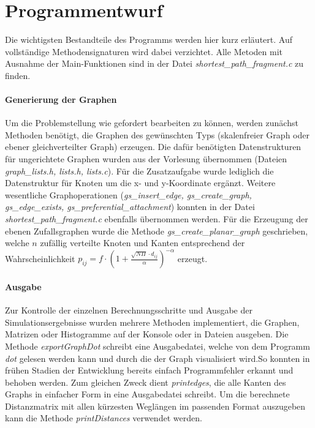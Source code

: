 \documentclass[10pt]{article}
\begin{document}
\section{Programmentwurf}

Die wichtigsten Bestandteile des Programms werden hier kurz erläutert. Auf vollständige Methodensignaturen wird dabei verzichtet. Alle Metoden mit Ausnahme der Main-Funktionen sind in der Datei \textit{shortest\_path\_fragment.c} zu finden.

\paragraph{Generierung der Graphen}
Um die Problemstellung wie gefordert bearbeiten zu können, werden zunächst Methoden benötigt, die Graphen des gewünschten Typs (skalenfreier Graph oder ebener gleichverteilter Graph) erzeugen. Die dafür benötigten Datenstrukturen für ungerichtete Graphen wurden aus der Vorlesung übernommen (Dateien \textit{graph\_lists.h, lists.h, lists.c}). Für die Zusatzaufgabe wurde lediglich die Datenstruktur für Knoten um die x- und y-Koordinate ergänzt. Weitere wesentliche Graphoperationen (\textit{gs\_insert\_edge, gs\_create\_graph, gs\_edge\_exists, gs\_preferential\_attachment}) konnten in der Datei \textit{shortest\_path\_fragment.c} ebenfalls übernommen werden. Für die Erzeugung der ebenen Zufallsgraphen wurde die Methode \textit{gs\_create\_planar\_graph} geschrieben, welche $n$ zufällig verteilte Knoten und Kanten entsprechend der Wahrscheinlichkeit $p_{ij} = f \cdot (1 + \frac{\sqrt{N \Pi} \cdot d_{ij}}{\alpha})^{-\alpha}$ erzeugt.

\paragraph{Ausgabe}
Zur Kontrolle der einzelnen Berechnungsschritte und Ausgabe der Simulationsergebnisse wurden mehrere Methoden implementiert, die Graphen, Matrizen oder Histogramme auf der Konsole oder in Dateien ausgeben. Die Methode \textit{exportGraphDot} schreibt eine Ausgabedatei, welche von dem Programm \textit{dot} gelesen werden kann und durch die der Graph visualisiert wird.So konnten in frühen Stadien der Entwicklung bereits einfach Programmfehler erkannt und behoben werden. Zum gleichen Zweck dient \textit{printedges}, die alle Kanten des Graphs in einfacher Form in eine Ausgabedatei schreibt. Um die berechnete Distanzmatrix mit allen kürzesten Weglängen im passenden Format auszugeben kann die Methode \textit{printDistances} verwendet werden.
\end{document}
